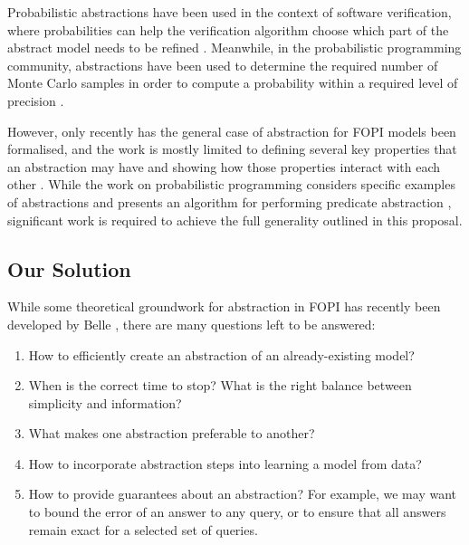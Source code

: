 \documentclass[11pt,english,twocolumn]{article}
\begin{document}
Probabilistic abstractions have been used in the context of software
verification, where probabilities can help the verification algorithm choose
which part of the abstract model needs to be refined
\cite{DBLP:conf/pldi/ZhangSN17}. Meanwhile, in the probabilistic programming
community, abstractions have been used to determine the required number of Monte
Carlo samples in order to compute a probability within a required level of
precision \cite{DBLP:conf/popl/Monniaux01}.

However, only recently has the general case of abstraction for FOPI models been
formalised, and the work is mostly limited to defining several key properties
that an abstraction may have and showing how those properties interact with each
other \cite{DBLP:journals/corr/abs-1810-02434}. While the work on probabilistic
programming considers specific examples of abstractions
\cite{DBLP:conf/uai/HoltzenMB17} and presents an algorithm for performing
predicate abstraction \cite{DBLP:conf/icml/HoltzenBM18}, significant work is
required to achieve the full generality outlined in this proposal.

\subsection*{Our Solution} \label{section:our_solution} %

While some theoretical groundwork for abstraction in FOPI has recently been
developed by Belle \cite{DBLP:journals/corr/abs-1810-02434}, there are many
questions left to be answered:
\begin{enumerate}
\item How to efficiently create an abstraction of an already-existing
  model? \label{q:1}
\item When is the correct time to stop? What is the right balance between
  simplicity and information? \label{q:2}
\item What makes one abstraction preferable to another? \label{q:3}
\item How to incorporate abstraction steps into learning a model from
  data? \label{q:4}
\item How to provide guarantees about an abstraction? For example, we may want
  to bound the error of an answer to any query, or to ensure that all answers
  remain exact for a selected set of queries. \label{q:5}
\end{enumerate}
\end{document}
